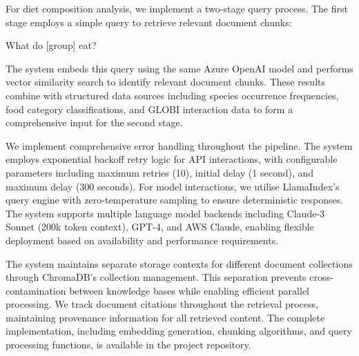   For diet composition analysis, we implement a two-stage query process. The first stage employs a simple query to retrieve relevant document chunks:
  
  \begin{prompt}
  What do [group] eat?
  \end{prompt}
  
  The system embeds this query using the same Azure OpenAI model and performs vector similarity search to identify relevant document chunks. These results combine with structured data sources including species occurrence frequencies, food category classifications, and GLOBI interaction data to form a comprehensive input for the second stage.
  
  We implement comprehensive error handling throughout the pipeline. The system employs exponential backoff retry logic for API interactions, with configurable parameters including maximum retries (10), initial delay (1 second), and maximum delay (300 seconds). For model interactions, we utilise LlamaIndex's query engine with zero-temperature sampling to ensure deterministic responses. The system supports multiple language model backends including Claude-3 Sonnet (200k token context), GPT-4, and AWS Claude, enabling flexible deployment based on availability and performance requirements.
  
  The system maintains separate storage contexts for different document collections through ChromaDB's collection management. This separation prevents cross-contamination between knowledge bases while enabling efficient parallel processing. We track document citations throughout the retrieval process, maintaining provenance information for all retrieved content. The complete implementation, including embedding generation, chunking algorithms, and query processing functions, is available in the project repository.
